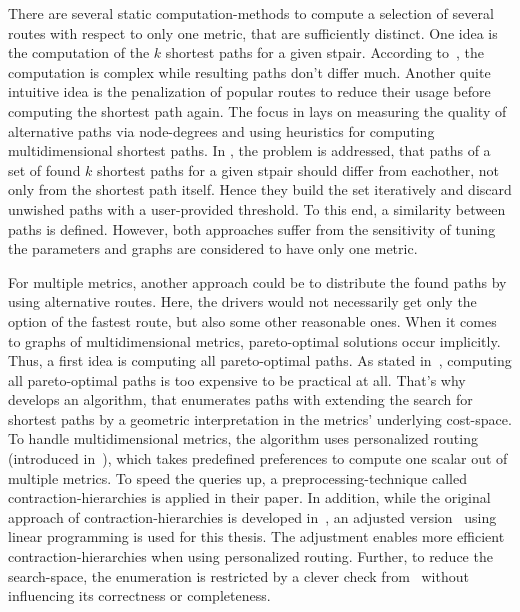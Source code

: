         There are several static computation-methods to compute a selection of several routes with respect to only one metric, that are sufficiently distinct.
        One idea is the computation of the $k$ shortest paths for a given \gls{stpair}.
        According to~\cite{eppstein:finding_k_shortest_paths}, the computation is complex while resulting paths don't differ much.
        Another quite intuitive idea is the penalization of popular routes to reduce their usage before computing the shortest path again.
        The focus in \cite{bader:alternative-route-graphs} lays on measuring the quality of alternative paths via node-degrees and using heuristics for computing multidimensional shortest paths.
        In \cite{chondrogiannis:k_shortest_paths}, the problem is addressed, that paths of a set of found $k$ shortest paths for a given \gls{stpair} should differ from eachother, not only from the shortest path itself.
        Hence they build the set iteratively and discard unwished paths with a user-provided threshold.
        To this end, a similarity between paths is defined.
        However, both approaches suffer from the sensitivity of tuning the parameters and graphs are considered to have only one metric.

        For multiple metrics, another approach could be to distribute the found paths by using alternative routes.
        Here, the drivers would not necessarily get only the option of the fastest route, but also some other reasonable ones.
        When it comes to graphs of multidimensional metrics, pareto-optimal solutions occur implicitly.
        Thus, a first idea is computing all pareto-optimal paths.
        As stated in~\cite{delling:pareto-paths}, computing all pareto-optimal paths is too expensive to be practical at all.
        That's why~\cite{barth:alternative_multicriteria_routes} develops an algorithm, that enumerates paths with extending the search for shortest paths by a geometric interpretation in the metrics' underlying cost-space.
        To handle multidimensional metrics, the algorithm uses personalized routing (introduced in~\cite{geisberger:route_planning}), which takes predefined preferences to compute one scalar out of multiple metrics.
        To speed the queries up, a preprocessing-technique called contraction-hierarchies is applied in their paper.
        In addition, while the original approach of contraction-hierarchies is developed in~\cite{geisberger:contraction_hierarchies}, an adjusted version~\cite{funke:personal-routes} using linear programming is used for this thesis.
        The adjustment enables more efficient contraction-hierarchies when using personalized routing.
        Further, to reduce the search-space, the enumeration is restricted by a clever check from~\cite{barth:alternative_routes} without influencing its correctness or completeness.

